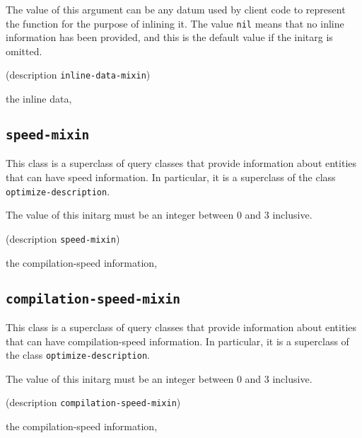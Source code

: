 {\footnotesize
{}
}

The value of this argument can be any datum used by client code to
represent the function for the purpose of inlining it.  The value
\texttt{nil} means that no inline information has been provided, and
this is the default value if the initarg is omitted.

{\footnotesize
{} {(description {\tt inline-data-mixin})}
}

 the inline data, 

\subsection{\texttt{speed-mixin}}
\label{sec-speed-mixin}

{\footnotesize
{}
}

This class is a superclass of query classes that provide information
about entities that can have speed information.  In particular, it is a
superclass of the class \texttt{optimize-description}.

{\footnotesize
{}
}

The value of this initarg must be an integer between $0$ and $3$
inclusive.

{\footnotesize
{} {(description {\tt speed-mixin})}
}

 the compilation-speed information, 

\subsection{\texttt{compilation-speed-mixin}}
\label{sec-compilation-speed-mixin}

{\footnotesize
{}
}

This class is a superclass of query classes that provide information
about entities that can have compilation-speed information.  In particular, it is a
superclass of the class \texttt{optimize-description}.

{\footnotesize
{}
}

The value of this initarg must be an integer between $0$ and $3$
inclusive.

{\footnotesize
{} {(description {\tt compilation-speed-mixin})}
}

 the compilation-speed information, 

